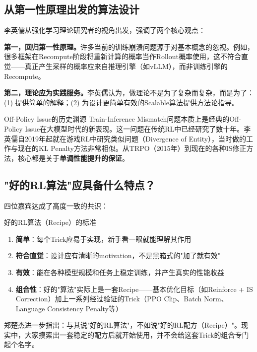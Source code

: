\documentclass[a4paper]{article}
\begin{document}
\subsection{从第一性原理出发的算法设计}

李英儒从强化学习理论研究者的视角出发，强调了两个核心观点：

\textbf{第一，回归第一性原理。}许多当前的训练崩溃问题源于对基本概念的忽视。例如，很多框架在Recompute阶段将重新计算的概率当作Rollout概率使用，这不符合直觉——真正产生采样的概率应来自推理引擎（如vLLM），而非训练引擎的Recompute。

\textbf{第二，理论应为实践服务。}李英儒认为，做理论不是为了复杂而复杂，而是为了：(1) 提供简单的解释；(2) 为设计更简单有效的Scalable算法提供方法论指导。

\begin{knowledgebox}{Off-Policy Issue的历史渊源}
Train-Inference Mismatch问题本质上是经典的Off-Policy Issue在大模型时代的新表现。这一问题在传统RL中已经研究了数十年。李英儒自2019年起就在游戏RL中研究类似问题（Divergence of Entity），当时做的工作与现在的KL Penalty方法非常相似。从TRPO（2015年）到现在的各种IS修正方法，核心都是关于\textbf{单调性能提升的保证}。
\end{knowledgebox}

\subsection{"好的RL算法"应具备什么特点？}

四位嘉宾达成了高度一致的共识：

\begin{importantbox}{好的RL算法（Recipe）的标准}
\begin{enumerate}
    \item \textbf{简单}：每个Trick应易于实现，新手看一眼就能理解其作用
    \item \textbf{符合直觉}：设计应有清晰的motivation，不是黑箱式的"加了就有效"
    \item \textbf{有效}：能在各种模型规模和任务上稳定训练，并产生真实的性能收益
    \item \textbf{组合性}：好的"算法"实际上是一套Recipe——基本优化目标（如Reinforce + IS Correction）加上一系列经过验证的Trick（PPO Clip、Batch Norm、Language Consistency Penalty等）
\end{enumerate}
\end{importantbox}

郑楚杰进一步指出：与其说"好的RL算法"，不如说"好的RL配方（Recipe）"。现实中，大家摸索出一套稳定的配方后就开始使用，并不会给这套Trick的组合专门起个名字。
\end{document}
